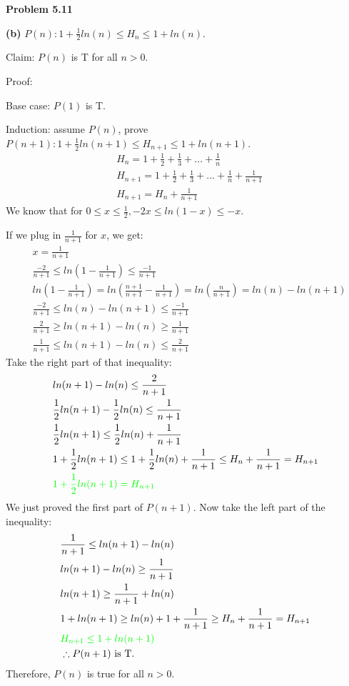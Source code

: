 \documentclass[fleqn]{article}
\begin{document}
\newpage
{\noindent\Large\bf Problem 5.11}\vspace{1em}\par
\textbf{(b)} $P(n): 1+\frac{1}{2}ln(n) \leq H_n \leq 1+ln(n)$.\par
Claim: $P(n)$ is T for all $n > 0$.\par
Proof:
\begin{addmargin}{2em}
	Base case: $P(1)$ is T.\par
	Induction: assume $P(n)$, prove $P(n+1): 1+\frac{1}{2}ln(n+1) \leq H_{n+1} \leq 1+ln(n+1)$.
	\begin{align*}
		&H_n = 1+\frac{1}{2}+\frac{1}{3}+...+\frac{1}{n}\\
		&H_{n+1} = 1+\frac{1}{2}+\frac{1}{3}+...+\frac{1}{n}+\frac{1}{n+1}\\
		&H_{n+1} = H_n+\frac{1}{n+1}
	\end{align*}
	We know that for $0 \leq x \leq \frac{1}{2}, -2x \leq ln(1-x) \leq -x$.\par
	If we plug in $\frac{1}{n+1}$ for $x$, we get:
	\begin{align*}
		&x = \frac{1}{n+1}\\
		&\frac{-2}{n+1} \leq ln(1-\frac{1}{n+1}) \leq \frac{-1}{n+1}\\
		&ln(1-\frac{1}{n+1}) = ln(\frac{n+1}{n+1}-\frac{1}{n+1}) = ln(\frac{n}{n+1}) = ln(n)-ln(n+1)\\
		&\frac{-2}{n+1} \leq ln(n)-ln(n+1) \leq \frac{-1}{n+1}\\
		&\frac{2}{n+1} \geq ln(n+1)-ln(n) \geq \frac{1}{n+1}\\
		&\frac{1}{n+1} \leq ln(n+1)-ln(n) \leq \frac{2}{n+1}
	\end{align*}
	Take the right part of that inequality:
	\begin{align*}
		&ln(n+1)-ln(n) \leq \frac{2}{n+1}\\
		&\frac{1}{2}ln(n+1)-\frac{1}{2}ln(n) \leq \frac{1}{n+1}\\
		&\frac{1}{2}ln(n+1) \leq \frac{1}{2}ln(n)+\frac{1}{n+1}\\
		&1+\frac{1}{2}ln(n+1) \leq 1+\frac{1}{2}ln(n)+\frac{1}{n+1} \leq H_n+\frac{1}{n+1} = H_{n+1}\\
		&{\color{green}1+\frac{1}{2}ln(n+1) = H_{n+1}}
	\end{align*}
	We just proved the first part of $P(n+1)$. Now take the left part of the inequality:
	\begin{align*}
		&\frac{1}{n+1} \leq ln(n+1)-ln(n)\\
		&ln(n+1)-ln(n) \geq \frac{1}{n+1}\\
		&ln(n+1) \geq \frac{1}{n+1}+ln(n)\\
		&1+ln(n+1) \geq ln(n)+1+\frac{1}{n+1} \geq H_n+\frac{1}{n+1} = H_{n+1}\\
		&{\color{green}H_{n+1} \leq 1+ln(n+1)}\\
		&\therefore P(n+1) \text{ is T.}
	\end{align*}
	Therefore, $P(n)$ is true for all $n > 0$.
\end{addmargin}
\end{document}
